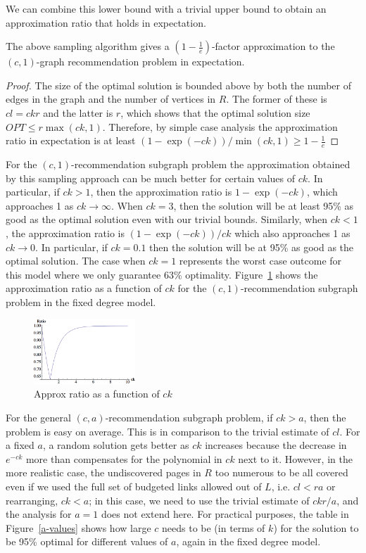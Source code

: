 We can combine this lower bound with a trivial upper bound to obtain an
approximation ratio that holds in expectation.  

\begin{thm}
The above sampling algorithm gives a $\left(1-\frac1e\right)$-factor approximation to the $(c,1)$-graph recommendation problem in expectation.
\end{thm}
\begin{proof}
The size of the optimal solution is bounded above by both the number
of edges in the graph and the number of vertices in $R$. The former of
these is $cl=ckr$ and the latter is $r$, which shows that the optimal solution size
$OPT \leq
r\max(ck,1)$. Therefore, by simple case analysis the approximation ratio
in expectation is at least $({1-\exp(-ck)})/\min(ck,1) \geq 1-\frac{1}{e} $
\end{proof}


For the $(c, 1)$-recommendation subgraph problem the approximation obtained by this sampling approach can be much better for certain values of $ck$. In particular,
if $ck>1$, then the approximation ratio is $1-\exp(-ck)$, which
approaches 1 as $ck\to\infty$. When $ck=3$, then the
solution will be at least 95\% as good as the optimal solution even
with our trivial bounds. Similarly, when $ck<1$, the approximation
ratio is $(1-\exp(-ck))/ck$ which also approaches 1 as $ck\to 0$. In
particular, if $ck=0.1$ then the solution will be at 95\% as good as
the optimal solution. The case when $ck=1$ represents the
worst case outcome for this model where we only guarantee 63\%
optimality. Figure~\ref{fig:simple_approx} shows the approximation ratio as a
function of $ck$ for the $(c,1)$-recommendation subgraph problem in the fixed degree model.\vs

\begin{figure}[H]
  \centering
  \includegraphics[width=0.34\textwidth]{images/sri_Original.png}
  \caption{Approx ratio as a function of $ck$ }\label{fig:simple_approx}
\end{figure}

For the general $(c, a)$-recommendation subgraph problem, if $ck>a$,
then the problem is easy on average. This is in comparison to the
trivial estimate of $cl$. For a fixed $a$, a random solution gets
better as $ck$ increases because the decrease in $e^{-ck}$ more than
compensates for the polynomial in $ck$ next to it. However, in the
more realistic case, the undiscovered pages in $R$ too numerous to be all covered even if we used the full set of budgeted links allowed out of $L$, i.e. $cl < ra$ or rearranging, $ck<a$; in this case, we need to use the trivial estimate of
$ckr/a$, and the analysis for $a=1$ does not extend here. For practical purposes, the table
in Figure~\ref{a-values} shows how large $c$ needs to be (in terms of $k$) for the
solution to be 95\% optimal for different values of $a$, again in the fixed degree model.\vs

